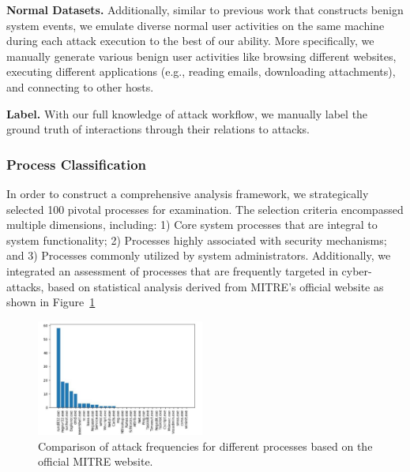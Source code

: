 \textbf{Normal Datasets.}
Additionally, similar to previous work that constructs benign system events, we emulate diverse normal user activities on the same machine during each attack execution to the best of our ability. More specifically, we manually generate various benign user activities like browsing different websites, executing different applications (e.g., reading emails, downloading attachments), and connecting to other hosts.

\textbf{Label.}
With our full knowledge of attack workﬂow, we manually label the ground truth of interactions through their relations to attacks.


\subsubsection{Process Classification}

In order to construct a comprehensive analysis framework, we strategically selected 100 pivotal processes for examination. The selection criteria encompassed multiple dimensions, including: 1) Core system processes that are integral to system functionality; 2) Processes highly associated with security mechanisms; and 3) Processes commonly utilized by system administrators. Additionally, we integrated an assessment of processes that are frequently targeted in cyber-attacks, based on statistical analysis derived from MITRE's official website as shown in Figure~\ref{fig-process}

\begin{figure}[h]
    \centering
      \includegraphics[width=0.49\textwidth]{figs/process.png}
    \caption{Comparison of attack frequencies for different processes based on the official MITRE website.}
    \label{fig-process}
\end{figure}

